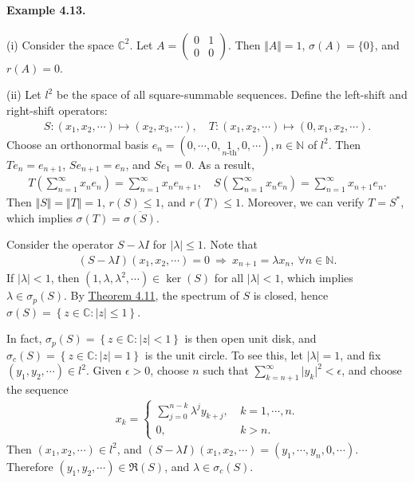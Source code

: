 \documentclass{article}
\begin{document}
\paragraph{Example 4.13.\label{example:4.13}} (i) Consider the space $\mathbb{C}^2$. Let $A=\begin{pmatrix}
	0 & 1 \\ 0 & 0
\end{pmatrix}$. Then $\Vert A\Vert=1$, $\sigma(A)=\{0\}$, and $r(A)=0$.
\vspace{0.1cm}

(ii) Let $l^2$ be the space of all square-summable sequences. Define the left-shift and right-shift operators:
\begin{align*}
	S:(x_1,x_2,\cdots)\mapsto (x_2,x_3,\cdots),\quad T:(x_1,x_2,\cdots)\mapsto(0,x_1,x_2,\cdots).
\end{align*}
Choose an orthonormal basis $e_n=(0,\cdots,0,\underset{n\text{-th}}{1},0,\cdots), n\in\mathbb{N}$ of $l^2$. Then $Te_{n}=e_{n+1}$, $Se_{n+1}=e_n$, and $Se_1=0$. As a result,
\begin{align*}
	T\left(\sum_{n=1}^\infty x_ne_n\right) = \sum_{n=1}^\infty x_ne_{n+1},\quad S\left(\sum_{n=1}^\infty x_ne_n\right) = \sum_{n=1}^\infty x_{n+1}e_n.
\end{align*}
Then $\Vert S\Vert=\Vert T\Vert =1$, $r(S)\leq 1$, and $r(T)\leq 1$. Moreover, we can verify $T=S^*$, which implies $\sigma(T)=\overline{\sigma(S)}$.\vspace{0.1cm}

Consider the operator $S-\lambda I$ for $\vert\lambda\vert\leq 1$. Note that
\begin{align*}
	(S-\lambda I)(x_1,x_2,\cdots)=0\ \Rightarrow\ x_{n+1}=\lambda x_n,\ \forall n\in\mathbb{N}.
\end{align*}
If $\vert\lambda\vert<1$, then $(1,\lambda,\lambda^2,\cdots)\in\ker(S)$ for all $\vert\lambda\vert<1$, which implies $\lambda\in\sigma_p(S)$. By \hyperref[thm:4.11]{Theorem 4.11}, the spectrum of $S$ is closed, hence $\sigma(S)=\left\{z\in\mathbb{C}:\vert z\vert\leq 1\right\}$.

In fact, $\sigma_p(S)=\left\{z\in\mathbb{C}:\vert z\vert< 1\right\}$ is then open unit disk, and $\sigma_c(S)=\left\{z\in\mathbb{C}:\vert z\vert= 1\right\}$ is the unit circle. To see this, let $\vert\lambda\vert=1$, and fix $(y_1,y_2,\cdots)\in l^2$. Given $\epsilon>0$, choose $n$ such that $\sum_{k=n+1}^\infty\vert y_k\vert^2 < \epsilon$, and choose the sequence
\begin{align*}
	x_k=\begin{cases}
		\sum_{j=0}^{n-k} \lambda^j y_{k+j},\ &k=1,\cdots,n.\\
		0,\ &k>n.
	\end{cases}
\end{align*}
Then $(x_1,x_2,\cdots)\in l^2$, and $(S-\lambda I)(x_1,x_2,\cdots) = (y_1,\cdots,y_n,0,\cdots)$. Therefore $(y_1,y_2,\cdots)\in\mathfrak{R}(S)$, and $\lambda\in\sigma_c(S)$.
\vspace{0.1cm}
\end{document}
